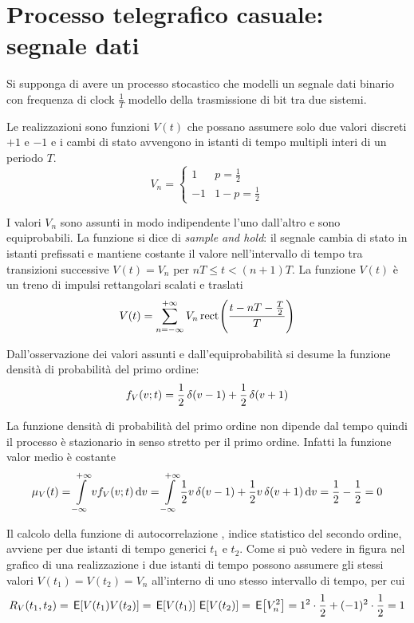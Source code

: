 \section{Processo telegrafico casuale: segnale dati}
Si supponga di avere un processo stocastico che modelli un segnale dati binario con frequenza di clock $\frac{1}{T}$ modello della trasmissione di bit tra due sistemi.

Le realizzazioni sono funzioni $V(t)$ che possano assumere solo due valori discreti $+1$ e $-1$ e i cambi di stato avvengono in istanti di tempo multipli interi di un periodo $T$.
\begin{equation}
	V_n=\begin{cases}
		1&p=\frac{1}{2}\\
		-1&1-p=\frac{1}{2}
	\end{cases}
\end{equation}

I valori $V_n$ sono assunti in modo indipendente l'uno dall'altro e sono equiprobabili. La funzione si dice di \emph{sample and hold}: il segnale cambia di stato in istanti prefissati e mantiene costante il valore nell'intervallo di tempo tra transizioni successive $V(t)=V_n$ per $n T\leq t<(n+1)T$.
La funzione $V(t)$ è un treno di impulsi rettangolari scalati e traslati
\begin{equation}
\label{eq:segnale_dati}
	V(t)=\sum_{n=-\infty}^{+\infty}{V_n\,{\operatorname{rect}}^{}\!\left({\frac{t-n T-\frac{T}{2}}{T}}\right)}
\end{equation}

Dall'osservazione dei valori assunti e dall'equiprobabilità si desume la funzione densità di probabilità del primo ordine:
\begin{equation}
	f_V(v;t)=\frac{1}{2}\operatorname{\delta}(v-1)+\frac{1}{2}\operatorname{\delta}(v+1)
\end{equation}

La funzione densità di probabilità del primo ordine non dipende dal tempo quindi il processo è stazionario in senso stretto per il primo ordine. Infatti la funzione valor medio è costante
\begin{equation}
\label{eq:segnale_binario_media}
	\mu_V(t)=\int\limits_{-\infty}^{+\infty}{v f_V(v;t)}{\,\mathop{}\!\mathrm{d}{v}}=\int\limits_{-\infty}^{+\infty}{\frac{1}{2}v\operatorname{\delta}(v-1)+\frac{1}{2}v\operatorname{\delta}(v+1)}{\,\mathop{}\!\mathrm{d}{v}}=\frac{1}{2}-\frac{1}{2}=0
\end{equation}

Il calcolo della funzione di autocorrelazione , indice statistico del secondo ordine, avviene per due istanti di tempo generici $t_1$ e $t_2$. Come si può vedere in figura nel grafico di una realizzazione i due istanti di tempo possono assumere gli stessi valori $V(t_1)=V(t_2)=V_n$ all'interno di uno stesso intervallo di tempo, per cui
\begin{equation}
	R_V(t_1,t_2)=\,{\operatorname{\mathsf{E}}}\!\left[{V(t_1)V(t_2)}\right]=\,{\operatorname{\mathsf{E}}}\!\left[{V(t_1)}\right]\,{\operatorname{\mathsf{E}}}\!\left[{V(t_2)}\right]=\,{\operatorname{\mathsf{E}}}\!\left[{V_n^2}\right]=1^2\cdot\frac{1}{2}+(-1)^2\cdot\frac{1}{2}=1
\end{equation}

